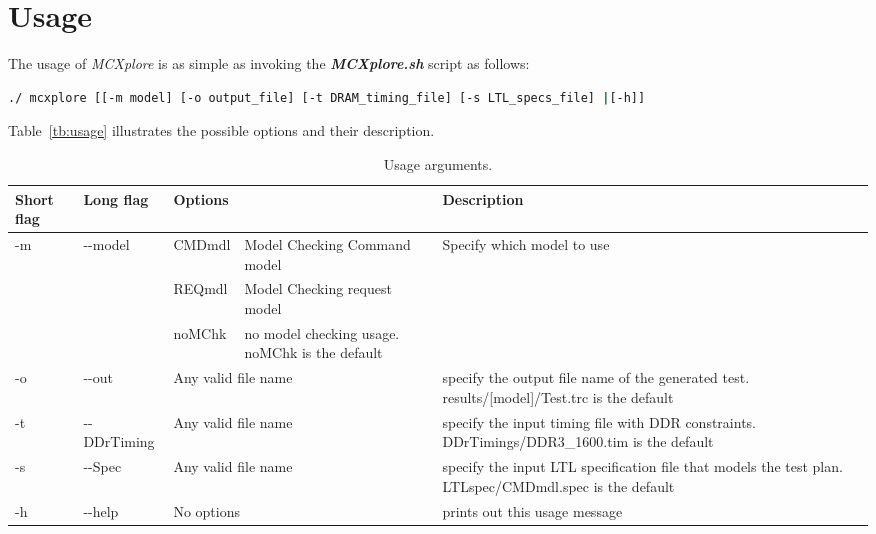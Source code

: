 \section{Usage}

The usage of \textit{MCXplore} is as simple as invoking the \textit{\textbf{MCXplore.sh}} script as follows:
\begin{lstlisting}[language=bash]
./ mcxplore [[-m model] [-o output_file] [-t DRAM_timing_file] [-s LTL_specs_file] |[-h]]

\end{lstlisting}
Table~\ref{tb:usage} illustrates the possible options and their description.
\begin{table}[h] 
\scriptsize
\centering
\caption{Usage arguments.\label{tb:usage}}
\begin{tabular}{|l|l|l|p{5cm}|p{5cm}|}
  \hline
   Short flag &  Long flag & \multicolumn{2}{l|}{Options} & Description\\
   \hline
  \multirow{3}{*}{-m} & \multirow{3}{*}{-{}-model} & CMDmdl & Model Checking Command model &   \multirow{3}{*}{Specify which model to use}\\ 
  
  & & REQmdl & Model Checking request model &\\
  & &noMChk& no model checking usage. noMChk is the default&\\
      
\hline


-o & -{}-out& \multicolumn{2}{l|}{Any valid file name}&specify the output file name of the generated test. results/[model]/Test.trc is the default\\

\hline


-t &  -{}-DDrTiming & \multicolumn{2}{l|}{Any valid file name} & specify the input timing file with DDR constraints. DDrTimings/DDR3\_1600.tim is the default\\

\hline

-s &  -{}-Spec &  \multicolumn{2}{l|}{Any valid file name} &	specify the input LTL specification file that models the test plan. LTLspec/CMDmdl.spec is the default\\

\hline

-h & -{}-help & \multicolumn{2}{l|}{No options}&prints out this usage message\\

\hline
\end{tabular}
\label{tb:vars}
\end{table}
